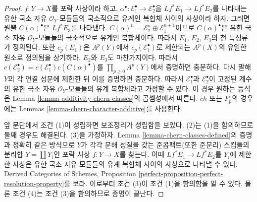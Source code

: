 \begin{proof}
$f : Y \to X$를 포락 사상이라 하고,
$\alpha^\bullet : \mathcal{E}_1^\bullet \to \mathcal{E}_2^\bullet$을
$Lf^*E_1 \to Lf^*E_2$를 나타내는 유한 국소 자유
$\mathcal{O}_Y$-모듈들의 국소적으로 유계인 복합체 사이의 사상이라
하자. 그러면 원뿔 $C(\alpha)^\bullet$은 $Lf^*E_3$를 나타낸다.
$C(\alpha)^n = \mathcal{E}_2^n \oplus \mathcal{E}_1^{n + 1}$이므로
$C(\alpha)^\bullet$은 유한 국소 자유
$\mathcal{O}_Y$-모듈들의 국소적으로 유계인 복합체이다.
따라서 $E_1$, $E_2$, $E_3$의 천 특성류가 정의된다.
또한 $c_p(E_1)$은 $A^p(Y)$에서 $c_p(\mathcal{E}_1^\bullet)$로
제한되는 $A^p(X)$의 유일한 원소로 정의됨을 상기하라.
$E_2$와 $E_3$도 마찬가지이다. 따라서
$c(\mathcal{E}_2^\bullet) =
c(\mathcal{E}_1^\bullet) c(C(\alpha)^\bullet)$를
$\prod_{p \geq 0} A^p(Y)$에서 증명하면 충분하다.
다시 말해 $Y$의 각 연결 성분에 제한한 뒤 이를 증명하면 충분하다.
따라서 $\mathcal{E}_1^\bullet$과 $\mathcal{E}_2^\bullet$이 고정된
계수의 유한 국소 자유 $\mathcal{O}_Y$-모듈들의 유계 복합체라고
가정할 수 있다. 이 경우 원하는 등식은 Lemma
\ref{lemma-additivity-chern-classes}의 곱셈성에서 따른다.
$ch$ 또는 $P_p$의 경우에는 Lemmas
\ref{lemma-chern-character-additive}를 사용한다.

\medskip\noindent
앞 문단에서 조건 (1)이 성립하면 보조정리가 성립함을 보았다.
(2)는 (1)을 함의하므로 둘째 경우도 해결된다. (3)을 가정하자.
Lemma \ref{lemma-chern-classes-defined}의 증명과 정확히 같은 방식으로
$Y$가 각각 분해 성질을 갖는 준콤팩트(또한 준분리) 스킴들의 분리합
$Y = \coprod Y_i$인 포락 사상 $f : Y \to X$를 찾는다. 이때
$Lf^*E_1 \to Lf^*E_2$를 $Y_i$에 제한한 사상은 유한 국소 자유
모듈들의 유계 복합체 사이의 사상으로 나타낼 수 있다.
Derived Categories of Schemes, Proposition
\ref{perfect-proposition-perfect-resolution-property}를 보라.
이로부터 조건 (3)이 조건 (1)을 함의함을 알 수 있다. 물론 조건 (4)는
조건 (3)을 함의하므로 증명이 끝난다.
\end{proof}

